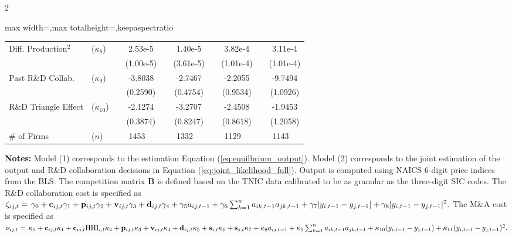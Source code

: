 \documentclass[12pt]{article}
\begin{document}
\begin{spacing}{2}
\begin{table}[tbp]
\begin{center}
\begin{adjustbox}{max width=\textwidth,max totalheight=\textheight,keepaspectratio}
\begin{threeparttable}
\begin{tabular}{llcccccccc}
    Diff. Production${}^{2}$ & ($\kappa_8$)  &     &   2.53e-5 &    &    1.40e-5 &     &    3.82e-4 &     &    3.11e-4    \\
                             &               &   &    (1.00e-5)&     &  (3.61e-5)& &       (1.01e-4)&   &     (1.01e-4)  \\
    Past R\&D Collab.        & ($\kappa_9$)  &     &  -3.8038  &   &    -2.7467  &   &     -2.2055  &     &   -9.7494   \\
                             &               &   &    (0.2590) &   &    (0.4754) &   &     (0.9534) &    &    (1.0926)  \\
    R\&D Triangle Effect     & ($\kappa_{10}$) &     &  -2.1274  &  &     -3.2707  &   &     -2.4508  &    &    -1.9453   \\
                             &               &    &   (0.3874)    &    &(0.8247) &   &     (0.8618) &     &   (1.2058)  \\ 
\midrule
    \# of Firms &  ($n$)     & \multicolumn{2}{c}{1453} & \multicolumn{2}{c}{1332} & \multicolumn{2}{c}{1129} & \multicolumn{2}{c}{1143} \\
\midrule
    \bottomrule
    \end{tabular}
\begin{tablenotes}[flushleft]
\item \small \textbf{Notes:} Model (1) corresponds to the estimation  Equation (\ref{eq:equilbrium_output}). Model (2) corresponds to the joint estimation of the output and R\&D collaboration decisions in Equation (\ref{eq:joint_likelihood_full}). Output is computed using NAICS 6-digit price indices from the BLS. The competition matrix $\textbf{B}$ is defined based on the TNIC data calibrated to be as granular as the three-digit SIC codes. The R\&D collaboration cost is specified as $\zeta_{ij,t}=
\phantom{\sum_k} \hspace{-0.5cm}
\gamma_0
+ \mathbf{c}_{ij,t} \gamma_1
+
\mathbf{p}_{ij,t}\gamma_2
+
\mathbf{v}_{ij,t}\gamma_3
+
\mathbf{d}_{ij,t}\gamma_4 
+
\gamma_5 a_{ij,t-1}
+
\gamma_6 \sum_{k=1}^n a_{ik,t-1} a_{jk,t-1}
+
\gamma_7 |y_{i,t-1}-y_{j,t-1}|
+
\gamma_8 |y_{i,t-1}-y_{j,t-1}|^2.$
The M\&A cost is specified as $\nu_{ij,t}
=
\phantom{\sum_k} \hspace{-0.5cm}
\kappa_0
+
\mathbf{c}_{ij,t} \kappa_1
+
\mathbf{c}_{ij,t}{\rm HHI}_{i,t} \kappa_2
+
\mathbf{p}_{ij,t}\kappa_3
+
\mathbf{v}_{ij,t}\kappa_4
+
\mathbf{d}_{ij,t}\kappa_5
+
\mathbf{s}_{i,t} \kappa_6
+
\mathbf{s}_{j,t} \kappa_7
+
\kappa_{8} a_{ij,t-1}
+
\kappa_{9} \sum_{k=1}^n a_{ik,t-1} a_{jk,t-1}
+
\kappa_{10} (y_{i,t-1}-y_{j,t-1})
+
\kappa_{11} (y_{i,t-1}-y_{j,t-1})^2.$
\end{tablenotes}
\end{threeparttable}
    \end{adjustbox}
\end{center}
\end{table}


\end{spacing}
\end{document}
